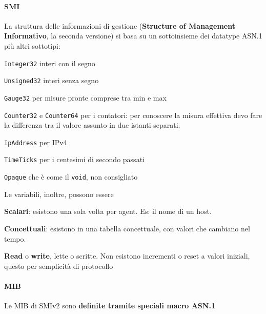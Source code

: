 \documentclass[10pt]{book}
\begin{document}
\paragraph{SMI} La struttura delle informazioni di gestione (\textbf{Structure of Management Informativo}, la seconda versione) si basa su un sottoinsieme dei datatype ASN.1 più altri sottotipi:
\begin{list}{}{}
	\item  \texttt{Integer32} interi con il segno
	\item \texttt{Unsigned32} interi senza segno
	\item \texttt{Gauge32} per misure pronte comprese tra min e max
	\item \texttt{Counter32} e \texttt{Counter64} per i contatori: per conoscere la misura effettiva devo fare la differenza tra il valore assunto in due istanti separati.
	\item \texttt{IpAddress} per IPv4
	\item \texttt{TimeTicks} per i centesimi di secondo passati
	\item \texttt{Opaque} che è come il \texttt{void}, non consigliato
\end{list}
Le variabili, inoltre, possono essere
\begin{list}{}{}
	\item \textbf{Scalari}: esistono una sola volta per agent. Es: il nome di un host.
	\item \textbf{Concettuali}: esistono in una tabella concettuale, con valori che cambiano nel tempo.
	\item \textbf{Read} o \textbf{write}, lette o scritte. Non esistono incrementi o reset a valori iniziali, questo per semplicità di protocollo
\end{list}
\paragraph{MIB} Le MIB di SMIv2 sono \textbf{definite tramite speciali macro ASN.1}
\end{document}
